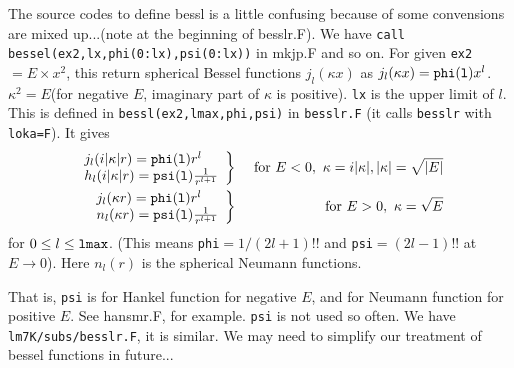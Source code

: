 \documentclass[a4paper,10pt,epsf,fleqn]{article}
\begin{document}
The source codes to define bessl is a little confusing because
of some convensions are mixed up...(note at the beginning of besslr.F).
We have \verb#call bessel(ex2,lx,phi(0:lx),psi(0:lx))# in mkjp.F 
and so on. For given \verb#ex2#$=E\times x^2$,
this return spherical Bessel functions $j_l(\kappa x)$
as $j_l(\kappa x)={\tt phi(l)}x^l$.
$\kappa^2=E$(for negative $E$, imaginary part of $\kappa$ is positive). 
\verb!lx! is the upper limit of $l$.
This is defined in \verb#bessl(ex2,lmax,phi,psi)# in \verb#besslr.F# 
(it calls \verb#besslr# with \verb#loka=F#). It gives
\begin{eqnarray}
\left.
\begin{array}{ll}
j_l(i|\kappa|r)={\tt phi(l)} r^l\\
h_l(i|\kappa|r)={\tt psi(l)} \frac{1}{r^{l+1}}
\end{array}
\right\}&& \ {\rm for}\ E<0, \ \kappa=i|\kappa|,
|\kappa|=\sqrt{|E|} \\
\left.
\begin{array}{ll}
j_l(\kappa r) = {\tt phi(l)} r^l \\
n_l(\kappa r) = {\tt psi(l)}\frac{1}{r^{l+1}}
\end{array} 
\right\}&& \ {\rm for}\ E>0, \ \kappa=\sqrt{E} 
\end{eqnarray}
for $0\le l \le{\tt lmax}$. (This means \verb#phi#$=1/(2l+1)!!$
and \verb#psi#$=(2l-1)!!$ at $E \to 0$). Here $n_l(r)$ is the spherical Neumann functions.

That is, \verb!psi! is for Hankel function 
for negative $E$, and for Neumann function for positive $E$. 
See hansmr.F, for example. \verb!psi! is not used so often.
We have \verb!lm7K/subs/besslr.F!, it is similar.
We may need to simplify our treatment of bessel functions in future...
\end{document}
